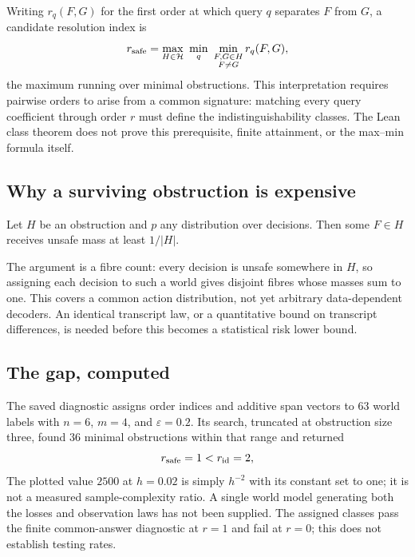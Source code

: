 
Writing $r_{q}(F,G)$ for the first order at which query $q$ separates $F$ from $G$, a candidate
resolution index is
\begin{equation}
r_{\rm safe}=\max_{H\in\mathcal{H}}\ \min_{q}\ \min_{\substack{F,G\in H\\ F\ne G}}r_{q}(F,G),
\label{eq:rsafe}
\end{equation}
the maximum running over minimal obstructions. This interpretation requires pairwise
orders to arise from a common signature: matching every query coefficient through order
$r$ must define the indistinguishability classes. The Lean class theorem does not prove
this prerequisite, finite attainment, or the max--min formula itself.

\subsection{Why a surviving obstruction is expensive}

\begin{theorem}
\label{thm:floor}
Let $H$ be an obstruction and $p$ any distribution over decisions. Then some $F\in H$
receives unsafe mass at least $1/|H|$.
\end{theorem}


The argument is a fibre count: every decision is unsafe somewhere in $H$, so assigning each
decision to such a world gives disjoint fibres whose masses sum to one. This covers
a common action distribution, not yet arbitrary data-dependent decoders. An identical
transcript law, or a quantitative bound on transcript differences, is needed before this
becomes a statistical risk lower bound.

\subsection{The gap, computed}

The saved diagnostic assigns order indices and additive span vectors to $63$ world
labels with $n=6$, $m=4$, and $\varepsilon=0.2$. Its search, truncated at obstruction
size three, found $36$ minimal obstructions within that range and returned
\begin{equation}
r_{\rm safe}=1<r_{\rm id}=2 ,
\label{eq:gapcomputed}
\end{equation}
The plotted value $2500$ at $h=0.02$ is simply $h^{-2}$ with its constant set to one;
it is not a measured sample-complexity ratio. A single world model generating both the
losses and observation laws has not been supplied. The assigned classes pass the finite
common-answer diagnostic at $r=1$ and fail at $r=0$; this does not establish testing rates.

